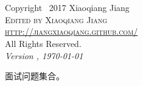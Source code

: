 \documentclass[8pt]{book}
\makeatletter
\renewcommand{\cleardoublepage}{
	\clearpage\ifodd\c@page\else
	\hbox{}
	\vspace*{\fill}
	\thispagestyle{empty}
	\newpage
	\fi}
\numberwithin{dummy}{section}
\theoremstyle{ocrenumbox}
\theoremstyle{blacknumex}
\theoremstyle{blacknumbox}
\theoremstyle{ocrenum}
\newif\ifusechapterimage
\newcommand{\thechapterimage}{}%
\newcommand{\chapterimage}[1]{\ifusechapterimage\renewcommand{\thechapterimage}{#1}\fi}%
\makeatother
\begin{document}

\newpage
~\vfill
\thispagestyle{empty}


\newpage
~\vfill
\thispagestyle{empty}

\noindent Copyright \textcopyright\ 2017 Xiaoqiang Jiang\\ %

\noindent \textsc{Edited by Xiaoqiang Jiang}\\ %

\noindent \textsc{\url{http://jiangxiaoqiang.github.com/}}\\

\noindent All Rights Reserved.\\ %

\noindent \textit{Version \currenttime, \today} %




\chapterimage{chapterhead1.pdf} %

\pagestyle{empty} %

\tableofcontents %

\cleardoublepage %

\pagestyle{fancy} %




面试问题集合。


\mainmatter
\end{document}

